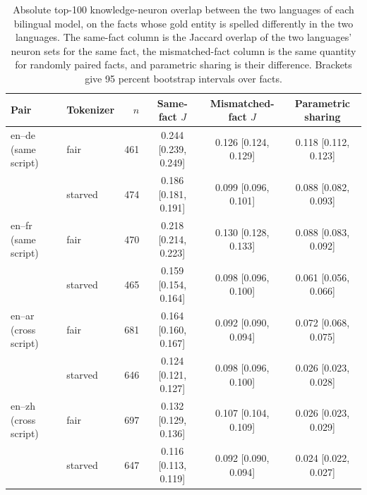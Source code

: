 \begin{table}[t]
\centering
\caption{Absolute top-100 knowledge-neuron overlap between the two languages of each bilingual model, on the facts whose gold entity is spelled differently in the two languages. The same-fact column is the Jaccard overlap of the two languages' neuron sets for the same fact, the mismatched-fact column is the same quantity for randomly paired facts, and parametric sharing is their difference. Brackets give 95 percent bootstrap intervals over facts.}
\label{tab:ps-absolute}
\begin{tabular}{@{}llrccc@{}}
\toprule
Pair & Tokenizer & $n$ & Same-fact $J$ & Mismatched-fact $J$ & Parametric sharing \\
\midrule
en--de (same script) & fair & 461 & 0.244 [0.239, 0.249] & 0.126 [0.124, 0.129] & 0.118 [0.112, 0.123] \\
 & starved & 474 & 0.186 [0.181, 0.191] & 0.099 [0.096, 0.101] & 0.088 [0.082, 0.093] \\
\addlinespace
en--fr (same script) & fair & 470 & 0.218 [0.214, 0.223] & 0.130 [0.128, 0.133] & 0.088 [0.083, 0.092] \\
 & starved & 465 & 0.159 [0.154, 0.164] & 0.098 [0.096, 0.100] & 0.061 [0.056, 0.066] \\
\addlinespace
en--ar (cross script) & fair & 681 & 0.164 [0.160, 0.167] & 0.092 [0.090, 0.094] & 0.072 [0.068, 0.075] \\
 & starved & 646 & 0.124 [0.121, 0.127] & 0.098 [0.096, 0.100] & 0.026 [0.023, 0.028] \\
\addlinespace
en--zh (cross script) & fair & 697 & 0.132 [0.129, 0.136] & 0.107 [0.104, 0.109] & 0.026 [0.023, 0.029] \\
 & starved & 647 & 0.116 [0.113, 0.119] & 0.092 [0.090, 0.094] & 0.024 [0.022, 0.027] \\
\bottomrule
\end{tabular}
\end{table}
